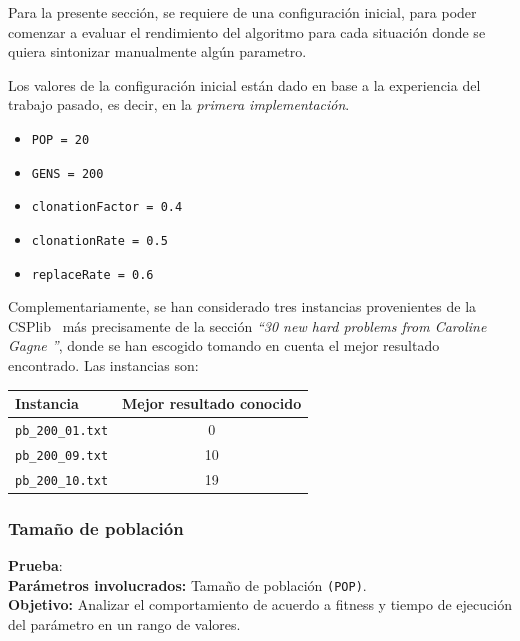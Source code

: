 
Para la presente sección, se requiere de una configuración inicial,
para poder comenzar a evaluar el rendimiento del algoritmo para
cada situación donde se quiera sintonizar manualmente algún parametro.

Los valores de la configuración inicial están dado en base a la experiencia
del trabajo pasado, es decir, en la \emph{primera implementación}.

\begin{itemize}
	\item \texttt{POP = 20}
	\item \texttt{GENS = 200}
	\item \texttt{clonationFactor = 0.4}
	\item \texttt{clonationRate = 0.5}
	\item \texttt{replaceRate = 0.6}
\end{itemize}

Complementariamente, se han considerado tres instancias provenientes de la CSPlib~\cite{CSP}
más precisamente de la sección \emph{``30 new hard problems from Caroline Gagne ''},
donde se han escogido tomando en cuenta el mejor resultado encontrado.
Las instancias son:

\begin{center}
	\begin{tabular}{|l|c|}
	\hline
	\textbf{Instancia} & \textbf{Mejor resultado conocido} \\\hline
	\texttt{pb\_200\_01.txt} & 0 \\\hline
	\texttt{pb\_200\_09.txt} & 10 \\\hline
	\texttt{pb\_200\_10.txt} & 19 \\\hline
	\end{tabular}
\end{center}
\newpage
\subsubsection{Tamaño de población}

\textbf{Prueba}: \\

\textbf{Parámetros involucrados:} Tamaño de población \texttt{(POP)}.\\

\textbf{Objetivo:} Analizar el comportamiento de acuerdo a fitness y tiempo de ejecución del parámetro en un rango de valores.\\

